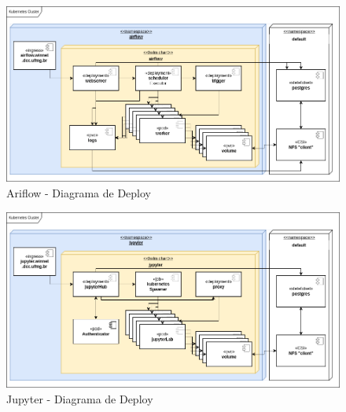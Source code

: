 \documentclass[10pt,brazil]{beamer}
\theoremstyle{definition}
\begin{document}

\begin{frame}[plain]
  \hspace*{-10mm}
  \begin{figure}
    \centering  
  \includegraphics[width=0.85\paperwidth]{tcc_airflow_deloy.png}
  \caption[AirFlow Deploy]{Ariflow - Diagrama de Deploy}
\end{figure}
\end{frame}

\begin{frame}[plain]
  \hspace*{-10mm}
  \begin{figure}
    \centering  
  \includegraphics[width=0.85\paperwidth]{tcc_jupyter_deploy.png}
      \caption[Jupyter Deploy]{Jupyter - Diagrama de Deploy}
  \end{figure}  
\end{frame}
\end{document}
